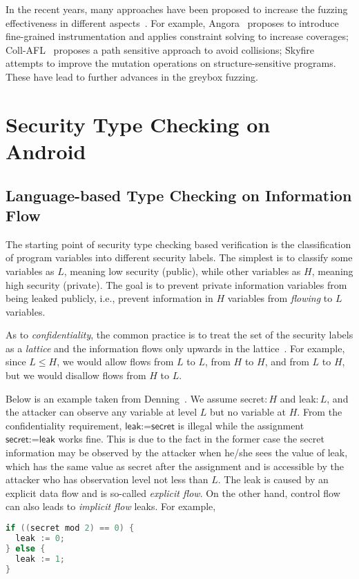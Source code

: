 In the recent years, many approaches have been proposed to increase the fuzzing effectiveness in different aspects~\cite{Bohme:2016:CGF,LiCMLLT17,Bohme:2017:DGF,FairFuzz,CollAFL,Angora,nezha,fuzz_survey}. For example, Angora~\cite{Angora} proposes to introduce fine-grained instrumentation and applies constraint solving to increase coverages; Coll-AFL~\cite{CollAFL} proposes a path sensitive approach to avoid collisions; Skyfire~\cite{junjie:2017sp:skyfire} attempts to improve the mutation operations on structure-sensitive programs. These have lead to further advances in the greybox fuzzing.

\section{Security Type Checking on Android}\label{sec:intro-sta}

\subsection{Language-based Type Checking on Information Flow}

The starting point of security type checking based verification is the classification of program variables into different security labels. The simplest is to classify some variables as $L$, meaning low security (public), while other variables as $H$, meaning high security (private). The goal is to prevent private information variables from being leaked publicly, i.e., prevent information in $H$ variables from \emph{flowing} to $L$ variables.

As to \emph{confidentiality}, the common practice is to treat the set of the security labels as a  \emph{lattice} and the information flows only upwards in the lattice~\cite{Denning:1977hwa}. For example, since $L\leq H$, we would allow flows from $L$ to $L$, from $H$ to $H$, and from $L$ to $H$, but we would disallow flows from $H$ to $L$.

Below is an example taken from Denning~\cite{Denning:1976cl}. We assume \textsf{secret}$:H$ and \textsf{leak}$:L$, and the attacker can observe any variable at level $L$ but no variable at $H$.
From the confidentiality requirement, $\textsf{leak:=secret}$ is illegal while the assignment $\textsf{secret:=leak}$ works fine. This is due to the fact in the former case the secret information may be observed by the attacker when he/she sees the value of \textsf{leak}, which has the same value as \textsf{secret} after the assignment and is accessible by the attacker who has observation level not less than $L$. The leak is caused by an explicit data flow and is so-called \emph{explicit flow}. On the other hand, control flow can also leads to \emph{implicit flow} leaks. For example,
\begin{lstlisting}[language=c,float=h]
if ((secret mod 2) == 0) {
  leak := 0;
} else {
  leak := 1;	
}  
\end{lstlisting}

